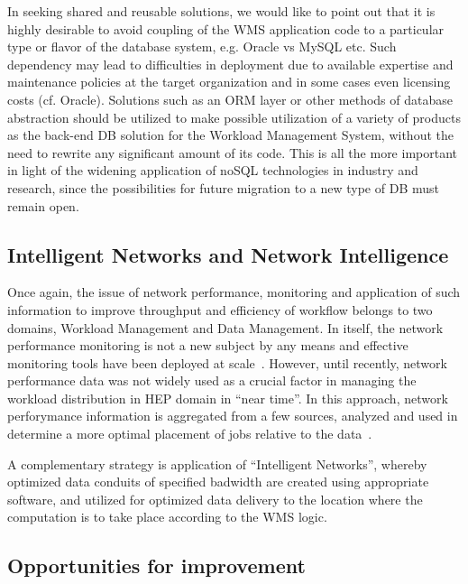 In seeking shared and reusable solutions, we would like to point out that it is highly desirable to avoid coupling of the WMS application code to a particular
type or flavor of the database system, e.g. Oracle vs MySQL etc. Such dependency may lead to difficulties in deployment due to available
expertise and maintenance policies at the target organization and in some cases even licensing costs (cf. Oracle). Solutions such as an ORM layer
or other methods of database abstraction
should be utilized to make possible utilization of a variety of  products as the back-end DB solution for the Workload Management System,
without the need to rewrite any significant amount of its code. This is all the more important in light of the widening application of noSQL
technologies in industry and research, since the possibilities for future migration to a new type of DB must remain open.


\subsection{Intelligent Networks and Network Intelligence}

Once again, the issue of network performance, monitoring and application of such information to improve throughput and efficiency of workflow
belongs to two domains, Workload Management and Data Management. In itself, the network performance monitoring is not a new subject by any means
and effective monitoring tools have been deployed at scale~\cite{perfsonar_chep12}. However, until recently, network performance data was not
widely used as a crucial factor in managing the workload distribution in HEP domain in ``near time''. In this approach, network perforymance information
is aggregated from a few sources, analyzed and used in determine a more optimal placement of jobs relative to the data~\cite{panda_chep13}.

A complementary strategy is application of ``Intelligent Networks'', whereby optimized data conduits of specified badwidth are created using
appropriate software, and utilized for optimized data delivery to the location where the computation is to take place according to the WMS logic.



\subsection{Opportunities for improvement}


